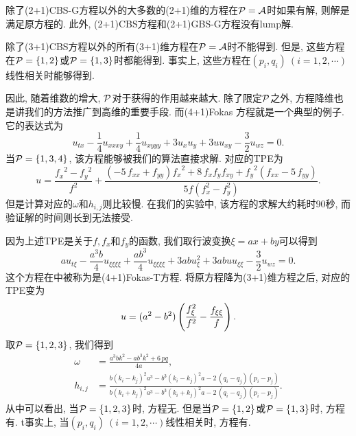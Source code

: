 除了(2+1)CBS-G方程以外的大多数的(2+1)维的方程在$\mathcal{P}= \mathcal{A}$时如果有解, 则解是满足原方程的. 此外, (2+1)CBS方程和(2+1)GBS-G方程没有lump解. 

除了(3+1)CBS方程以外的所有(3+1)维方程在$\mathcal{P}= \mathcal{A}$时不能得到\TrueSol{}. 但是, 这些方程在$\mathcal{P}=\{1,2\}$或$\mathcal{P}=\{1,3\}$时都能得到\TrueSol{}. 事实上, 这些方程在$(p_i,q_i)~(i=1,2,\cdots)$线性相关时能够得到\TrueSol{}.

因此, 随着维数的增大, $\mathcal{P}$对于获得\TrueSol{}的作用越来越大. 除了限定$\mathcal{P}$之外, 方程降维也是讲我们的方法推广到高维的重要手段. 而(4+1)Fokas 方程\CITEdaFokas{}就是一个典型的例子. 它的表达式为
\begin{equation}
    u_{tx}-\frac{1}{4}u_{xxxy}+\frac{1}{4}u_{xyyy}+3u_xu_y+3uu_{xy}-\frac{3}{2}u_{wz}=0. \label{Fokas}
\end{equation}
当$\mathcal{P}=\{1,3,4\}$, 该方程能够被我们的算法直接求解. 对应的TPE为
\begin{equation}
u={\frac {{f_{{x}}}^{2}-{f_{{y}}}^{2}}{{f}^{2}}}+{\frac { \left( -5\,f_{
{{ xx}}}+f_{{{ yy}}} \right) {f_{{x}}}^{2}+8\,f_{{x}}f_{{y}}f_{{
{ xy}}}+{f_{{y}}}^{2} \left( f_{{{ xx}}}-5\,f_{{{ yy}}}
\right) }{5f(f_x^2-f_y^2)}}.
\end{equation}
但是计算对应的$\omega$和$h_{i,j}$则比较慢. 在我们的实验中, 该方程的求解大约耗时90秒, 而验证解的时间则长到无法接受. 

因为上述TPE是关于$f,f_x$和$f_y$的函数, 我们取行波变换$\xi=ax+by$可以得到
\begin{equation}
    au_{t\xi}-\frac{a^3b}{4}u_{\xi\xi\xi\xi}+\frac{ab^3}{4}u_{\xi\xi\xi\xi}+3abu_{\xi}^2+3abuu_{\xi\xi}-\frac{3}{2}u_{wz}=0.  \label{Fokas-T}
\end{equation}
这个方程在中被称为是(4+1)Fokas-T方程. 将原方程降为(3+1)维方程之后, 对应的TPE变为
\begin{equation}
    u=(a^2-b^2)\left(\frac{f_{\xi}^2}{f^2}-\frac{f_{\xi\xi}}{f}\right).
\end{equation}
取$\mathcal{P}=\{1,2,3\}$, 我们得到
\begin{equation}
\begin{split}
    \omega&={\frac {{a}^{3}b{k}^{2}-a{b}^{3}{k}^{2}+6\,pq}{4a}}, \\
    h_{{i,j}}&={\frac {b \left( k_{{i}}-k_{{j}} \right) ^{2}{a}^{3}-{b}^{3}
    \left( k_{{i}}-k_{{j}} \right) ^{2}a-2\, \left( q_{{i}}-q_{{j}}
    \right)  \left( p_{{i}}-p_{{j}} \right) }{b \left( k_{{i}}+k_{{j}}
    \right) ^{2}{a}^{3}-{b}^{3} \left( k_{{i}}+k_{{j}} \right) ^{2}a-2\,
    \left( q_{{i}}-q_{{j}} \right)  \left( p_{{i}}-p_{{j}} \right) }}.
\end{split}
\end{equation}
从中可以看出, 当$\mathcal{P}=\{1,2,3\}$时, 方程无\TrueSol{}. 但是当$\mathcal{P}=\{1,2\}$或$\mathcal{P}=\{1,3\}$时, 方程有\TrueSol{}. t事实上, 当$(p_i,q_i)~(i=1,2,\cdots)$线性相关时, 方程有\TrueSol{}.

